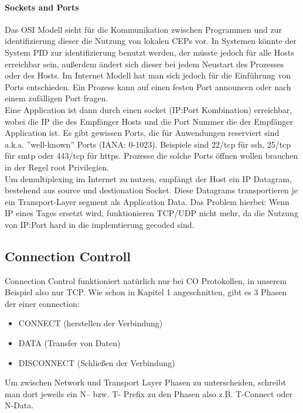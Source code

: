         \paragraph{Sockets and Ports} 
            Das OSI Modell sieht für die Kommunikation zwischen Programmen und zur identifizierung dieser die Nutzung von lokalen CEPs vor. In Systemen könnte der System PID zur identifizierung benutzt werden, der müsste jedoch für alle Hosts erreichbar sein, außerdem ändert sich dieser bei jedem Neustart des Prozesses oder des Hosts. Im Internet Modell hat man sich jedoch für die Einführung von Ports entschieden. Ein Prozess kann auf einen festen Port announcen oder nach einem zufälligen Port fragen. \\
            Eine Application ist dann durch einen socket (IP:Port Kombination) erreichbar, wobei die IP die des Empfänger Hosts und die Port Nummer die der Empfänger Application ist. Es gibt gewissen Ports, die für Anwendungen reserviert sind a.k.a. ''well-known'' Ports (IANA: 0-1023). Beispiele sind 22/tcp für ssh, 25/tcp für smtp oder 443/tcp für https. Prozesse die solche Ports öffnen wollen brauchen in der Regel root Privilegien. \\ 
            Um demultiplexing im Internet zu nutzen, empfängt der Host ein IP Datagram, bestehend aus source und destionation Socket. Diese Datagrams transportieren je ein Transport-Layer segment als Application Data. Das Problem hierbei: Wenn IP eines Tages ersetzt wird, funktionieren TCP/UDP nicht mehr, da die Nutzung von IP:Port hard in die implemtierung gecoded sind. 
    
    \subsection{Connection Controll}
        Connection Control funktioniert natürlich nur bei CO Protokollen, in unserem Beispiel also nur TCP. Wie schon in Kapitel 1 angeschnitten, gibt es 3 Phasen der einer connection:
        \begin{itemize}
            \item CONNECT (herstellen der Verbindung)
            \item DATA (Transfer von Daten)
            \item DISCONNECT (Schließen der Verbindung)
        \end{itemize}
        Um zwischen Network und Transport Layer Phasen zu unterscheiden, schreibt man dort jeweils ein N-- bzw. T- Prefix zu den Phasen also z.B. T-Connect oder N-Data.

